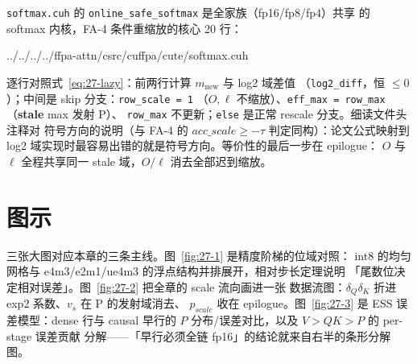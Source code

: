 \texttt{softmax.cuh} 的 \texttt{online\_safe\_softmax} 是全家族（fp16/fp8/fp4）共享
的 softmax 内核，FA-4 条件重缩放的核心 20 行：


  {../../../../ffpa-attn/csrc/cuffpa/cute/softmax.cuh}

逐行对照式~\ref{eq:27-lazy}：前两行计算 $m_{\mathrm{new}}$ 与 log2 域差值
（\texttt{log2\_diff}，恒 $\le 0$）；中间是 skip 分支：\texttt{row\_scale = 1}
（$O,\ell$ 不缩放）、\texttt{eff\_max = row\_max}（\textbf{stale} max 发射 P）、
\texttt{row\_max} 不更新；\texttt{else} 是正常 rescale 分支。细读文件头注释对
符号方向的说明（与 FA-4 的 $acc\_scale \ge -\tau$ 判定同构）：论文公式映射到
log2 域实现时最容易出错的就是符号方向。等价性的最后一步在 epilogue：
$O$ 与 $\ell$ 全程共享同一 stale 域，$O/\ell$ 消去全部迟到缩放。

\section{图示}

三张大图对应本章的三条主线。图~\ref{fig:27-1} 是精度阶梯的位域对照：
int8 的均匀网格与 e4m3/e2m1/ue4m3 的浮点结构并排展开，相对步长定理说明
「尾数位决定相对误差」。图~\ref{fig:27-2} 把全章的 scale 流向画进一张
数据流图：$\delta_Q\delta_K$ 折进 exp2 系数、$v_s$ 在 P 的发射域消去、
$p_{scale}$ 收在 epilogue。图~\ref{fig:27-3} 是 ESS 误差模型：dense 行与
causal 早行的 $P$ 分布/误差对比，以及 $V>QK>P$ 的 per-stage 误差贡献
分解——「早行必须全链 fp16」的结论就来自右半的条形分解图。

